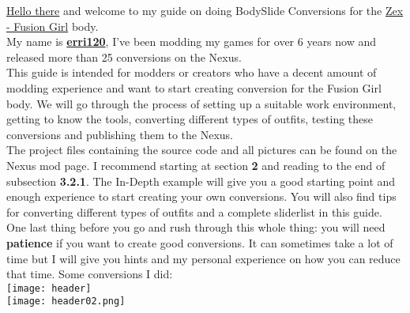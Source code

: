\href{https://www.youtube.com/watch?v=rEq1Z0bjdwc&t=8s}{Hello there} and welcome to my guide on doing BodySlide Conversions for the 
\href{https://www.nexusmods.com/fallout4/mods/37268}{Zex - Fusion Girl} body.\\
My name is \href{https://www.nexusmods.com/users/6672467}{\textbf{erri120}}, I've been modding my games for over 6 years now and 
released more than 25 conversions on the Nexus.\\
This guide is intended for modders or creators who have a decent amount of modding experience and want to start creating conversion 
for the Fusion Girl body. We will go through the process of setting up a suitable work environment, getting to know the tools, 
converting different types of outfits, testing these conversions and publishing them to the Nexus.\\
The project files containing the source code and all pictures can be found on the Nexus mod page. I recommend starting at section \textbf{2}
and reading to the end of subsection \textbf{3.2.1}. The In-Depth example will give you a good starting point and enough experience 
to start creating your own conversions. You will also find tips for converting different types of outfits and a complete 
sliderlist in this guide.\\
One last thing before you go and rush through this whole thing: you will need \textbf{patience} if you want to create good conversions.
It can sometimes take a lot of time but I will give you hints and my personal experience on how you can reduce that time. Some conversions I did:\\
\texttt{[image: header]}\\
\texttt{[image: header02.png]}